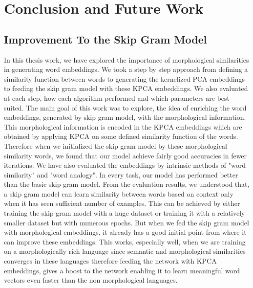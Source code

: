 \chapter{Conclusion and Future Work}
\label{cha:concl}

\section{Improvement To the Skip Gram Model}

In this thesis work, we have explored the importance of morphological similarities in generating word embeddings. We took a step by step approach from defining a similarity function between words to generating the kernelized PCA embeddings to feeding the skip gram model with these KPCA embeddings. We also evaluated at each step, how each algorithm performed and which parameters are best suited. The main goal of this work was to explore, the idea of enriching the word embeddings, generated by skip gram model, with the morphological information. This morphological information is encoded in the KPCA embeddings which are obtained by applying KPCA on some defined similarity function of the words. Therefore when we initialized the skip gram model by these morphological similarity words, we found that our model achieve fairly good accuracies in fewer iterations. We have also evaluated the embeddings by intrinsic methods of "word similarity" and "word analogy". In every task, our model has performed better than the basic skip gram model. From the evaluation results, we understood that, a skip gram model can learn similarity between words based on context only when it has seen sufficient number of examples. This can be achieved by either training the skip gram model with a huge dataset or training it with a relatively smaller dataset but with numerous epochs. 
But when we fed the skip gram model with morphological embeddings, it already has a good initial point from where it can improve these embeddings. This works, especially well, when we are training on a morphologically rich language since semantic and morphological similarities converges in these languages therefore feeding the network with KPCA embeddings, gives a boost to the network enabling it to learn meaningful word vectors even faster than the non morphological languages.\\
